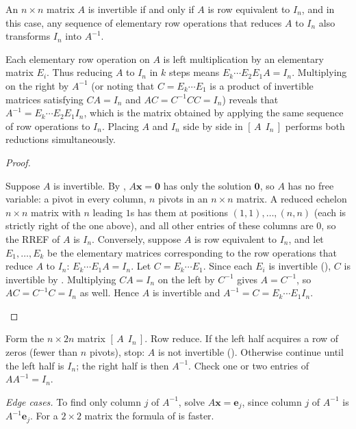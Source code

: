 \documentclass[10pt]{scrartcl}
\newcommand{\vv}[1]{\mathbf{#1}}
\begin{document}
\begin{theorem*}
  An $n\times n$ matrix $A$ is invertible if and only if $A$ is row equivalent to $I_n$, and in this case, any sequence of elementary row operations that reduces $A$ to $I_n$ also transforms $I_n$ into $A^{-1}$.
\end{theorem*}
\begin{ideabox}
  Each elementary row operation on $A$ is left multiplication by an elementary matrix $E_i$. Thus reducing $A$ to $I_n$ in $k$ steps means $E_k\cdots E_2E_1 A = I_n$. Multiplying on the right by $A^{-1}$ (or noting that $C=E_k\cdots E_1$ is a product of invertible matrices satisfying $CA=I_n$ and $AC=C^{-1}CC=I_n$) reveals that $A^{-1}=E_k\cdots E_2E_1 I_n$, which is the matrix obtained by applying the same sequence of row operations to $I_n$. Placing $A$ and $I_n$ side by side in $[\,A\ \ I_n\,]$ performs both reductions simultaneously.
\end{ideabox}
\begin{proof}
  \begin{steps}
    \ii Suppose $A$ is invertible. By , $A\vv x=\vv 0$ has only the solution $\vv 0$, so $A$ has no free variable: a pivot in every column, $n$ pivots in an $n\times n$ matrix. A reduced echelon $n\times n$ matrix with $n$ leading $1$s has them at positions $(1,1),\dots,(n,n)$ (each is strictly right of the one above), and all other entries of these columns are $0$, so the RREF of $A$ is $I_n$.
    \ii Conversely, suppose $A$ is row equivalent to $I_n$, and let $E_1,\dots,E_k$ be the elementary matrices corresponding to the row operations that reduce $A$ to $I_n$: $E_k\cdots E_1 A = I_n$.
    \ii Let $C=E_k\cdots E_1$. Since each $E_i$ is invertible (), $C$ is invertible by . Multiplying $CA=I_n$ on the left by $C^{-1}$ gives $A=C^{-1}$, so $AC=C^{-1}C=I_n$ as well. Hence $A$ is invertible and $A^{-1}=C=E_k\cdots E_1 I_n$.
  \end{steps}
\end{proof}

\begin{steps}
  \ii Form the $n\times 2n$ matrix $[\,A\ \ I_n\,]$.
  \ii Row reduce. If the left half acquires a row of zeros (fewer than $n$ pivots), stop: $A$ is not invertible ().
  \ii Otherwise continue until the left half is $I_n$; the right half is then $A^{-1}$.
  \ii Check one or two entries of $AA^{-1}=I_n$.
\end{steps}
\emph{Edge cases.} To find only column $j$ of $A^{-1}$, solve $A\vv x=\vv e_j$, since column $j$ of $A^{-1}$ is $A^{-1}\vv e_j$. For a $2\times2$ matrix the formula of  is faster.
\end{document}
